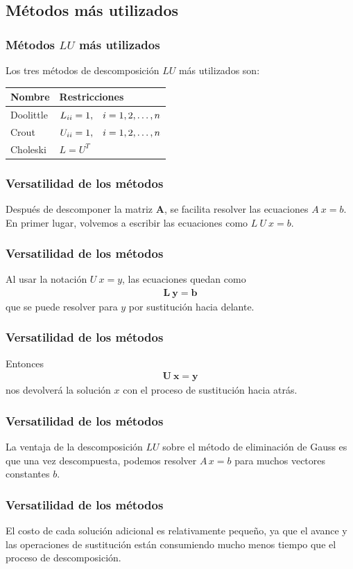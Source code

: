 \subsection{Métodos más utilizados}
\begin{frame}
\frametitle{Métodos $LU$ más utilizados}
Los tres métodos de descomposición $LU$ más utilizados son:
\begin{table}
\begin{tabular}{l | l}
    Nombre & Restricciones \\ \hline
    Doolittle & $L_{ii} = 1, \hspace{0.3cm} i= 1,2,\ldots,n$ \\
    Crout & $U_{ii} = 1, \hspace{0.3cm} i=1,2,\ldots,n$ \\
    Choleski & $L = U^{T}$
\end{tabular}
\end{table}
\end{frame}
\begin{frame}
\frametitle{Versatilidad de los métodos}
Después de descomponer la matriz $\mathbf{A}$, se facilita resolver las ecuaciones $A \: x = b$. 
\\
\bigskip
En primer lugar, volvemos a escribir las ecuaciones como $L \: U \: x = b$.
\end{frame}
\begin{frame}
\frametitle{Versatilidad de los métodos}
Al usar la notación $U \: x = y$, las ecuaciones quedan como
\begin{align*}
\mathbf{L \: y = b}
\end{align*}
que se puede resolver para $y$ por sustitución hacia delante. 
\end{frame}
\begin{frame}
\frametitle{Versatilidad de los métodos}
Entonces
\begin{align*}
\mathbf{U \: x = y}
\end{align*}
nos devolverá la solución $x$ con el proceso de sustitución hacia atrás.
\end{frame}
\begin{frame}
\frametitle{Versatilidad de los métodos}
La ventaja de la descomposición $LU$ sobre el método de eliminación de Gauss es que una vez descompuesta, podemos resolver $A \, x = b$ para muchos vectores constantes $b$.
\end{frame}
\begin{frame}
\frametitle{Versatilidad de los métodos}
El costo de cada solución adicional es relativamente pequeño, ya que el avance y las operaciones de sustitución están consumiendo mucho menos tiempo que el proceso de descomposición.
\end{frame}

